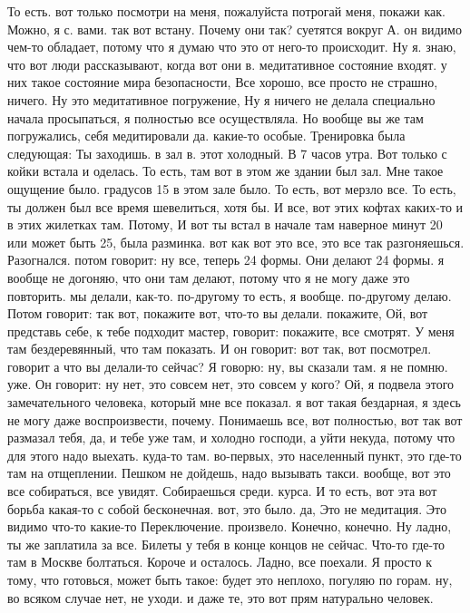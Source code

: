 То есть. вот только посмотри на меня, пожалуйста потрогай меня, покажи как.
Можно, я с. вами.
так вот встану. Почему они так?
суетятся вокруг А.
он видимо чем-то обладает, потому что я думаю что
это от него-то происходит. Ну я.
знаю, что вот люди рассказывают, когда вот они в.
медитативное состояние входят.
у них такое состояние мира безопасности, Все хорошо, все просто не страшно, ничего. Ну это медитативное погружение, Ну я ничего не делала специально начала просыпаться, я полностью все осуществляла. Но вообще вы же там погружались, себя медитировали да.
какие-то особые. Тренировка была следующая: Ты заходишь.
в зал в.
этот холодный.
В 7 часов утра.
Вот только с койки встала и оделась.
То есть, там вот в этом же здании был зал.
Мне такое ощущение было. градусов 15 в этом зале было.
То есть, вот мерзло все.
То есть, ты должен был все время шевелиться, хотя бы.
И все, вот этих кофтах каких-то и в этих жилетках там.
Потому, И вот ты встал в начале там наверное минут 20 или может быть 25, была разминка. вот как вот это все, это все так разгоняешься.
Разогнался. потом говорит: ну все, теперь 24 формы.
Они делают 24 формы. я вообще не догоняю, что они там делают, потому что я не могу даже это повторить. мы делали, как-то.
по-другому то есть, я вообще.
по-другому делаю.
Потом говорит: так вот, покажите вот, что-то вы делали. покажите, Ой, вот представь себе, к тебе подходит мастер, говорит: покажите, все смотрят.
У меня там бездеревянный, что там показать.
И он говорит: вот так, вот посмотрел. говорит а что вы делали-то сейчас?
Я говорю: ну, вы сказали там.
я не помню.
уже.
Он говорит: ну нет, это совсем нет, это совсем у кого? Ой, я подвела этого замечательного человека, который мне все показал. я вот такая бездарная, я здесь не могу даже воспроизвести, почему.
Понимаешь все, вот полностью, вот так вот размазал тебя, да, и тебе уже там, и холодно господи, а уйти некуда, потому что для этого надо выехать.
куда-то там. во-первых, это населенный пункт, это где-то там на отщеплении.
Пешком не дойдешь, надо вызывать такси. вообще, вот это все собираться, все увидят.
Собираешься среди.
курса. И то есть, вот эта вот борьба какая-то с собой бесконечная.
вот, это было. да, Это не медитация.
Это видимо что-то какие-то Переключение.
произвело.
Конечно, конечно.
Ну ладно, ты же заплатила за все.
Билеты у тебя в конце концов не сейчас.
Что-то где-то там в Москве болтаться.
Короче и осталось.
Ладно, все поехали.
Я просто к тому, что готовься, может быть такое:
будет это неплохо, погуляю по горам. ну, во всяком случае нет, не уходи. и даже те, это вот прям натурально человек.
